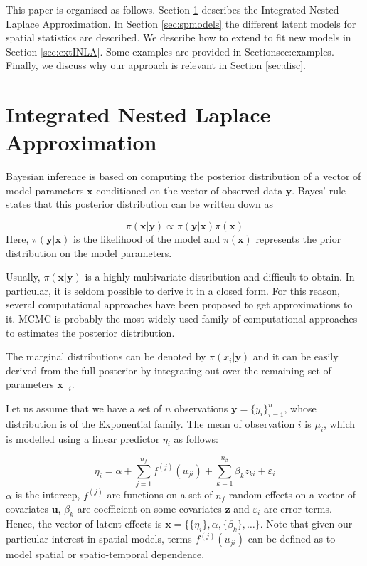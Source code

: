\documentclass[article]{jss}
\begin{document}
This paper is organised as follows. Section \ref{sec:INLA} describes
the Integrated Nested Laplace Approximation.  In Section \ref{sec:spmodels}
the different latent models for spatial statistics are described.
We describe how to extend  to fit new models in Section
\ref{sec:extINLA}. Some examples are provided in Section{sec:examples}.
Finally, we discuss why our approach is relevant in Section \ref{sec:disc}.

\section{Integrated Nested Laplace Approximation}
\label{sec:INLA}

Bayesian inference is based on computing the posterior distribution of a
vector of model parameters $\mathbf{x}$ conditioned on the vector of observed
data $\mathbf{y}$. Bayes' rule states that this posterior distribution
can be written down as

$$
\pi(\mathbf{x}|\mathbf{y}) \propto \pi(\mathbf{y}|\mathbf{x}) \pi(\mathbf{x})
$$
\noindent
Here, $\pi(\mathbf{y}|\mathbf{x})$ is the likelihood of the model and
$\pi(\mathbf{x})$ represents the prior distribution on the model parameters.


Usually, $\pi(\mathbf{x}|\mathbf{y})$ is a highly multivariate distribution
and difficult to obtain. In particular, it is seldom possible to derive it in
a closed form. For this reason, several computational approaches  have been 
proposed to get approximations to it. MCMC is probably the most widely used
family of computational approaches to estimates the posterior distribution.

The marginal distributions can be denoted by $\pi(x_i|\mathbf{y})$
and it can be easily derived from the full posterior by integrating
out over the remaining set of parameters $\mathbf{x}_{-i}$.

Let us assume that we have a set of $n$ observations 
$\mathbf{y}=\{y_i\}_ {i=1}^n$, whose distribution is of the Exponential family.
The mean of observation $i$ is $\mu_i$, which is modelled using a linear
predictor $\eta_i$ as follows:

$$
\eta_i=\alpha+\sum_{j=1}^{n_f} f^{(j)}(u_{ji})+\sum_{k=1}^{n_{\beta}}\beta_k z_{ki}+\varepsilon_i
$$
\noindent
$\alpha$ is the intercep, $f^{(j)}$ are functions on a set of $n_f$ random
effects on a vector of covariates $\mathbf{u}$, $\beta_k$ are coefficient on
some covariates $\mathbf{z}$ and $\varepsilon_i$ are error terms. Hence, the
vector of latent effects is $\mathbf{x}=\{\{\eta_i\}, \alpha, \{\beta_k\},
\ldots\}$. Note that given our particular interest in spatial models, terms
$f^{(j)}(u_{ji})$ can be defined as to model spatial or spatio-temporal
dependence.
\end{document}
